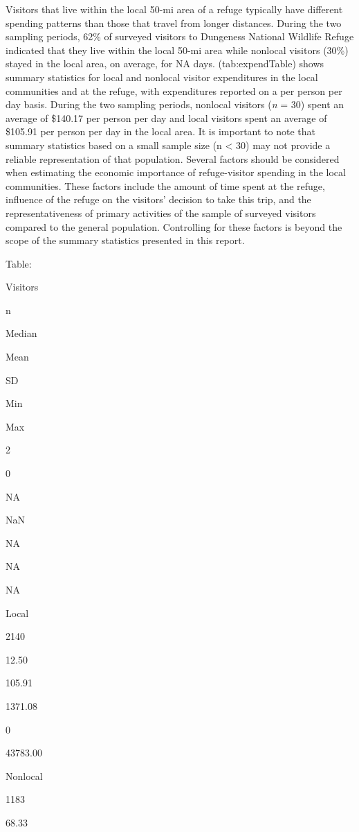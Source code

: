 \documentclass[]{book}
\begin{document}
Visitors that live within the local 50-mi area of a refuge typically
have different spending patterns than those that travel from longer
distances. During the two sampling periods, 62\% of surveyed visitors to
Dungeness National Wildlife Refuge indicated that they live within the
local 50-mi area while nonlocal visitors (30\%) stayed in the local
area, on average, for NA days. (tab:expendTable) shows summary
statistics for local and nonlocal visitor expenditures in the local
communities and at the refuge, with expenditures reported on a per
person per day basis. During the two sampling periods, nonlocal visitors
(\emph{n} = 30) spent an average of \$140.17 per person per day and
local visitors spent an average of \$105.91 per person per day in the
local area. It is important to note that summary statistics based on a
small sample size (n \textless{} 30) may not provide a reliable
representation of that population. Several factors should be considered
when estimating the economic importance of refuge-visitor spending in
the local communities. These factors include the amount of time spent at
the refuge, influence of the refuge on the visitors' decision to take
this trip, and the representativeness of primary activities of the
sample of surveyed visitors compared to the general population.
Controlling for these factors is beyond the scope of the summary
statistics presented in this report.

Table: \label{tab:spend-table}

Visitors

n

Median

Mean

SD

Min

Max

2

0

NA

NaN

NA

NA

NA

Local

2140

12.50

105.91

1371.08

0

43783.00

Nonlocal

1183

68.33
\end{document}
